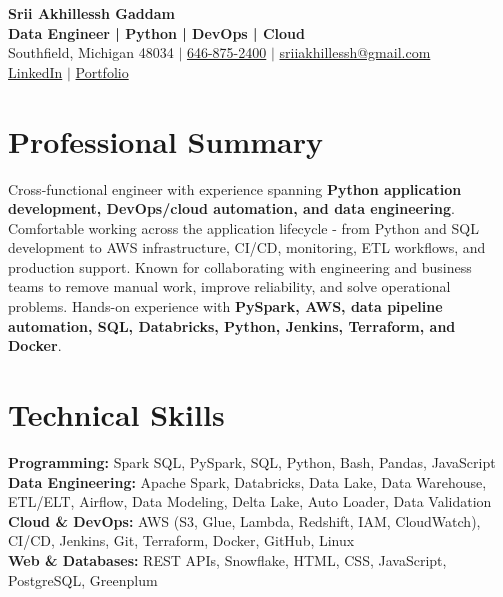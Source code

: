 \documentclass[letterpaper,10pt]{article}
\begin{document}
\fontsize{9.35pt}{10.45pt}\selectfont

\begin{center}
    {\LARGE \textbf{Srii Akhillessh Gaddam}} \\[-1pt]
    \textbf{Data Engineer | Python | DevOps | Cloud} \\[2pt]
    Southfield, Michigan 48034 $|$
    \href{tel:6468752400}{646-875-2400} $|$
    \href{mailto:sriiakhillessh@gmail.com}{sriiakhillessh@gmail.com} \\[1pt]
    \href{https://www.linkedin.com/in/srii-akhiilessh-gaddam-b48668191/}{LinkedIn} $|$
    \href{https://sriiakhillesshg.github.io/portfolio/}{Portfolio}
\end{center}
\vspace{-8pt}

\section{Professional Summary}
\small{Cross-functional engineer with experience spanning \textbf{Python application development, DevOps/cloud automation, and data engineering}. Comfortable working across the application lifecycle - from Python and SQL development to AWS infrastructure, CI/CD, monitoring, ETL workflows, and production support. Known for collaborating with engineering and business teams to remove manual work, improve reliability, and solve operational problems. Hands-on experience with \textbf{PySpark, AWS, data pipeline automation, SQL, Databricks, Python, Jenkins, Terraform, and Docker}.}

\section{Technical Skills}
\small{
\textbf{Programming:} Spark SQL, PySpark, SQL, Python, Bash, Pandas, JavaScript \\
\textbf{Data Engineering:} Apache Spark, Databricks, Data Lake, Data Warehouse, ETL/ELT, Airflow, Data Modeling, Delta Lake, Auto Loader, Data Validation \\
\textbf{Cloud \& DevOps:} AWS (S3, Glue, Lambda, Redshift, IAM, CloudWatch), CI/CD, Jenkins, Git, Terraform, Docker, GitHub, Linux \\
\textbf{Web \& Databases:} REST APIs, Snowflake, HTML, CSS, JavaScript, PostgreSQL, Greenplum
}
\end{document}
